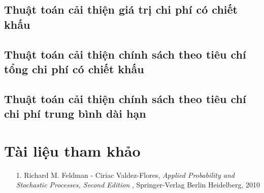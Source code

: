 \documentclass[12pt,a4paper]{report}
\begin{document}
	\section{Thuật toán cải thiện giá trị chi phí có chiết khấu}
	\section{Thuật toán cải thiện chính sách theo tiêu chí tổng chi phí có chiết khấu}
	\section{Thuật toán cải thiện chính sách theo tiêu chí chi phí trung bình dài hạn} 
	\chapter{Tài liệu tham khảo}
	\begin{itemize}
		\item[1.] Richard M. Feldman - Ciriac Valdez-Flores, \textit{Applied Probability and Stochastic Processes, Second Edition} , Springer-Verlag Berlin Heidelberg, 2010
	\end{itemize}
	
\end{document}

